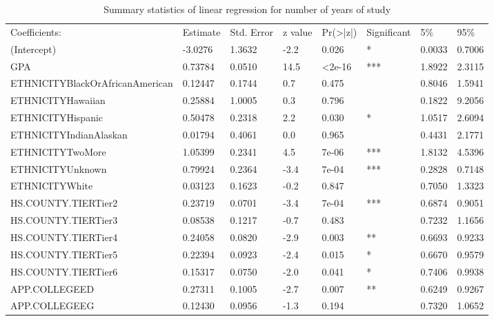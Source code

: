 \documentclass[12pt,english]{report}
\begin{document}
\begin{table}[H]
\centering
\caption{Summary statistics of linear regression for number of years of study }
\label{LR_num_years}
\begin{adjustbox}{width=0.95\textwidth}
\begin{tabular}{|llllllll|} \hline \hline
Coefficients:                   & Estimate & Std. Error & z value & Pr(\textgreater|z|) & Significant & 5\%    & 95\%   \\

(Intercept)                    &  -3.0276 & 1.3632  & -2.2  &  0.026 & *  &0.0033 & 0.7006 \\  
GPA                            &  0.73784 & 0.0510  & 14.5  & <2e-16 & ***&1.8922 & 2.3115 \\
ETHNICITYBlackOrAfricanAmerican&  0.12447 & 0.1744  &  0.7  &  0.475 &    &0.8046 & 1.5941 \\
ETHNICITYHawaiian              &  0.25884 & 1.0005 &   0.3  &  0.796 &    &0.1822 & 9.2056 \\
ETHNICITYHispanic              &  0.50478 & 0.2318 &   2.2  &  0.030 & *  &1.0517 & 2.6094 \\
ETHNICITYIndianAlaskan         &  0.01794 & 0.4061 &   0.0  &  0.965 &    &0.4431 & 2.1771 \\
ETHNICITYTwoMore               &  1.05399 & 0.2341 &   4.5  &  7e-06 & ***&1.8132 & 4.5396 \\
ETHNICITYUnknown               &  0.79924 & 0.2364 &  -3.4  &  7e-04 & ***&0.2828 & 0.7148 \\
ETHNICITYWhite                 &  0.03123 & 0.1623 &  -0.2  &  0.847 &    &0.7050 & 1.3323 \\
HS.COUNTY.TIERTier2            &  0.23719 & 0.0701 &  -3.4  &  7e-04 & ***&0.6874 & 0.9051 \\
HS.COUNTY.TIERTier3            &  0.08538 & 0.1217 &  -0.7  &  0.483 &    &0.7232 & 1.1656 \\
HS.COUNTY.TIERTier4            &  0.24058 & 0.0820 &  -2.9  &  0.003 & ** &0.6693 & 0.9233 \\
HS.COUNTY.TIERTier5            &  0.22394 & 0.0923 &  -2.4  &  0.015 & *  &0.6670 & 0.9579 \\
HS.COUNTY.TIERTier6            &  0.15317 & 0.0750 &  -2.0  &  0.041 & *  &0.7406 & 0.9938 \\
APP.COLLEGEED                  &  0.27311 & 0.1005 &  -2.7  &  0.007 & ** &0.6249 & 0.9267 \\
APP.COLLEGEEG                  &  0.12430 & 0.0956 &  -1.3  &  0.194 &    &0.7320 & 1.0652 \\

\end{tabular}
\end{adjustbox}
\end{table}
\end{document}
